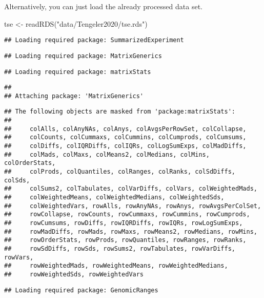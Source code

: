 \documentclass[
  oneside]{book}
\newenvironment{Shaded}{\begin{snugshade}}{\end{snugshade}}
\newcommand{\FunctionTok}[1]{\textcolor[rgb]{0.00,0.00,0.00}{#1}}
\newcommand{\NormalTok}[1]{#1}
\newcommand{\OtherTok}[1]{\textcolor[rgb]{0.56,0.35,0.01}{#1}}
\newcommand{\StringTok}[1]{\textcolor[rgb]{0.31,0.60,0.02}{#1}}
\begin{document}
Alternatively, you can just load the already processed data set.

\begin{Shaded}
\begin{Highlighting}[]
\NormalTok{tse }\OtherTok{\textless{}{-}} \FunctionTok{readRDS}\NormalTok{(}\StringTok{"data/Tengeler2020/tse.rds"}\NormalTok{)}
\end{Highlighting}
\end{Shaded}

\begin{verbatim}
## Loading required package: SummarizedExperiment
\end{verbatim}

\begin{verbatim}
## Loading required package: MatrixGenerics
\end{verbatim}

\begin{verbatim}
## Loading required package: matrixStats
\end{verbatim}

\begin{verbatim}
## 
## Attaching package: 'MatrixGenerics'
\end{verbatim}

\begin{verbatim}
## The following objects are masked from 'package:matrixStats':
## 
##     colAlls, colAnyNAs, colAnys, colAvgsPerRowSet, colCollapse,
##     colCounts, colCummaxs, colCummins, colCumprods, colCumsums,
##     colDiffs, colIQRDiffs, colIQRs, colLogSumExps, colMadDiffs,
##     colMads, colMaxs, colMeans2, colMedians, colMins, colOrderStats,
##     colProds, colQuantiles, colRanges, colRanks, colSdDiffs, colSds,
##     colSums2, colTabulates, colVarDiffs, colVars, colWeightedMads,
##     colWeightedMeans, colWeightedMedians, colWeightedSds,
##     colWeightedVars, rowAlls, rowAnyNAs, rowAnys, rowAvgsPerColSet,
##     rowCollapse, rowCounts, rowCummaxs, rowCummins, rowCumprods,
##     rowCumsums, rowDiffs, rowIQRDiffs, rowIQRs, rowLogSumExps,
##     rowMadDiffs, rowMads, rowMaxs, rowMeans2, rowMedians, rowMins,
##     rowOrderStats, rowProds, rowQuantiles, rowRanges, rowRanks,
##     rowSdDiffs, rowSds, rowSums2, rowTabulates, rowVarDiffs, rowVars,
##     rowWeightedMads, rowWeightedMeans, rowWeightedMedians,
##     rowWeightedSds, rowWeightedVars
\end{verbatim}

\begin{verbatim}
## Loading required package: GenomicRanges
\end{verbatim}
\end{document}
